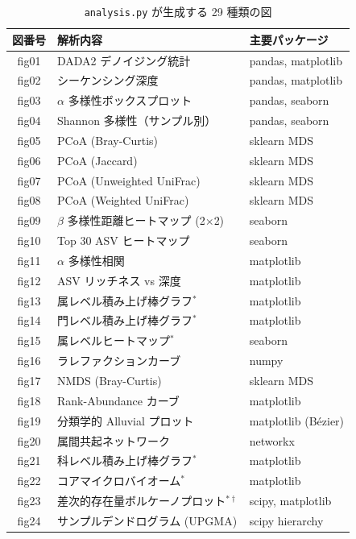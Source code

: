 \documentclass[12pt, a4paper]{article}
\begin{document}
\begin{table}[h]
  \centering
  \caption{\texttt{analysis.py} が生成する 29 種類の図}
  \label{tab:analysis_figures}
  \begin{tabular}{clp{5.5cm}}
    \toprule
    \textbf{図番号} & \textbf{解析内容} & \textbf{主要パッケージ} \\
    \midrule
    fig01 & DADA2 デノイジング統計 & pandas, matplotlib \\
    fig02 & シーケンシング深度 & pandas, matplotlib \\
    fig03 & $\alpha$ 多様性ボックスプロット & pandas, seaborn \\
    fig04 & Shannon 多様性（サンプル別） & pandas, seaborn \\
    fig05 & PCoA (Bray-Curtis) & sklearn MDS \\
    fig06 & PCoA (Jaccard) & sklearn MDS \\
    fig07 & PCoA (Unweighted UniFrac) & sklearn MDS \\
    fig08 & PCoA (Weighted UniFrac) & sklearn MDS \\
    fig09 & $\beta$ 多様性距離ヒートマップ (2$\times$2) & seaborn \\
    fig10 & Top 30 ASV ヒートマップ & seaborn \\
    fig11 & $\alpha$ 多様性相関 & matplotlib \\
    fig12 & ASV リッチネス vs 深度 & matplotlib \\
    fig13 & 属レベル積み上げ棒グラフ$^*$ & matplotlib \\
    fig14 & 門レベル積み上げ棒グラフ$^*$ & matplotlib \\
    fig15 & 属レベルヒートマップ$^*$ & seaborn \\
    \midrule
    fig16 & ラレファクションカーブ & numpy \\
    fig17 & NMDS (Bray-Curtis) & sklearn MDS \\
    fig18 & Rank-Abundance カーブ & matplotlib \\
    fig19 & 分類学的 Alluvial プロット & matplotlib (B\'{e}zier) \\
    fig20 & 属間共起ネットワーク & networkx \\
    fig21 & 科レベル積み上げ棒グラフ$^*$ & matplotlib \\
    fig22 & コアマイクロバイオーム$^*$ & matplotlib \\
    fig23 & 差次的存在量ボルケーノプロット$^{*\dagger}$ & scipy, matplotlib \\
    fig24 & サンプルデンドログラム (UPGMA) & scipy hierarchy \\

\end{tabular}
\end{table}
\end{document}
